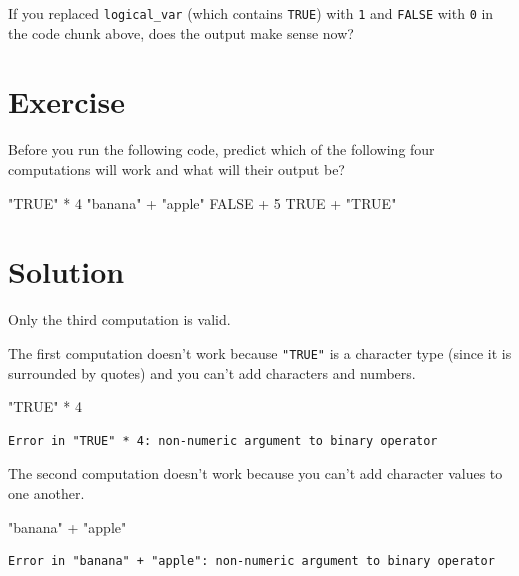 \documentclass[
  letterpaper,
  DIV=11,
  numbers=noendperiod]{scrreprt}
\newenvironment{Shaded}{\begin{snugshade}}{\end{snugshade}}
\newcommand{\ConstantTok}[1]{\textcolor[rgb]{0.56,0.35,0.01}{#1}}
\newcommand{\DecValTok}[1]{\textcolor[rgb]{0.68,0.00,0.00}{#1}}
\newcommand{\SpecialCharTok}[1]{\textcolor[rgb]{0.37,0.37,0.37}{#1}}
\newcommand{\StringTok}[1]{\textcolor[rgb]{0.13,0.47,0.30}{#1}}
\begin{document}
If you replaced \texttt{logical\_var} (which contains \texttt{TRUE})
with \texttt{1} and \texttt{FALSE} with \texttt{0} in the code chunk
above, does the output make sense now?

\section{Exercise}

Before you run the following code, predict which of the following four
computations will work and what will their output be?

\begin{Shaded}
\begin{Highlighting}[]
\StringTok{"TRUE"} \SpecialCharTok{*} \DecValTok{4}
\StringTok{"banana"} \SpecialCharTok{+} \StringTok{"apple"}
\ConstantTok{FALSE} \SpecialCharTok{+} \DecValTok{5}
\ConstantTok{TRUE} \SpecialCharTok{+} \StringTok{"TRUE"}
\end{Highlighting}
\end{Shaded}

\section{Solution}

Only the third computation is valid.

The first computation doesn't work because \texttt{"TRUE"} is a
character type (since it is surrounded by quotes) and you can't add
characters and numbers.

\begin{Shaded}
\begin{Highlighting}[]
\StringTok{"TRUE"} \SpecialCharTok{*} \DecValTok{4}
\end{Highlighting}
\end{Shaded}

\begin{verbatim}
Error in "TRUE" * 4: non-numeric argument to binary operator
\end{verbatim}

The second computation doesn't work because you can't add character
values to one another.

\begin{Shaded}
\begin{Highlighting}[]
\StringTok{"banana"} \SpecialCharTok{+} \StringTok{"apple"}
\end{Highlighting}
\end{Shaded}

\begin{verbatim}
Error in "banana" + "apple": non-numeric argument to binary operator
\end{verbatim}
\end{document}

